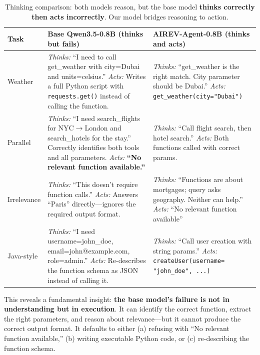 \documentclass[10pt,twocolumn]{article}
\begin{document}
\begin{table}[!htbp]
\centering
\caption{Thinking comparison: both models reason, but the base model \textbf{thinks correctly then acts incorrectly}. Our model bridges reasoning to action.}
\label{tab:thinking_compare}
\small
\begin{tabularx}{\textwidth}{p{1.5cm}|X|X}
\toprule
\textbf{Task} & \textbf{Base Qwen3.5-0.8B (thinks but fails)} & \textbf{AIREV-Agent-0.8B (thinks and acts)} \\
\midrule
Weather & \textit{Thinks:} ``I need to call get\_weather with city=Dubai and units=celsius.'' \newline \textit{Acts:} Writes a full Python script with \texttt{requests.get()} instead of calling the function. & \textit{Thinks:} ``get\_weather is the right match. City parameter should be Dubai.'' \newline \textit{Acts:} \texttt{get\_weather(city="Dubai")} \\
\midrule
Parallel & \textit{Thinks:} ``I need search\_flights for NYC$\to$London and search\_hotels for the stay.'' Correctly identifies both tools and all parameters. \newline \textit{Acts:} \textbf{``No relevant function available.''} & \textit{Thinks:} ``Call flight search, then hotel search.'' \newline \textit{Acts:} Both functions called with correct params. \\
\midrule
Irrelevance & \textit{Thinks:} ``This doesn't require function calls.'' \newline \textit{Acts:} Answers ``Paris'' directly---ignores the required output format. & \textit{Thinks:} ``Functions are about mortgages; query asks geography. Neither can help.'' \newline \textit{Acts:} ``No relevant function available'' \\
\midrule
Java-style & \textit{Thinks:} ``I need username=john\_doe, email=john@example.com, role=admin.'' \newline \textit{Acts:} Re-describes the function schema as JSON instead of calling it. & \textit{Thinks:} ``Call user creation with string params.'' \newline \textit{Acts:} \texttt{createUser(username= "john\_doe", ...)} \\
\bottomrule
\end{tabularx}
\end{table}

This reveals a fundamental insight: \textbf{the base model's failure is not in understanding but in execution}. It can identify the correct function, extract the right parameters, and reason about relevance---but it cannot produce the correct output format. It defaults to either (a) refusing with ``No relevant function available,'' (b) writing executable Python code, or (c) re-describing the function schema.
\end{document}
